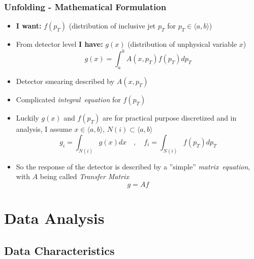 \documentclass[compress]{beamer}
\newcommand{\pt}{p_{T}}
\begin{document}
\begin{frame}
\frametitle{Unfolding - Mathematical Formulation}
\begin{itemize}
   \item \textbf{I want:} $f(\pt)$ (distribution of inclusive jet $\pt$ for $\pt \in
    \langle a, b \rangle$)
  \item From detector level \textbf{I have:} $g(x)$ (distribution of unphysical variable
    $x$)
  \begin{equation*}
    g(x) = \int_a^b A(x,\pt) f(\pt) d\pt
  \end{equation*}
  \item Detector smearing described by $A(x,\pt)$
  \item Complicated \textit{\color{red}integral~equation} for $f(\pt)$
   \item Luckily $g(x)$ and $f(\pt)$ are for practical purpose discretized and in
    analysis, I assume $x \in \langle a, b \rangle$, $N(i) \subset \langle
    a , b \rangle$ 
  \begin{equation*}
    g_i = \int_{N(i)}g(x)dx \quad , \quad f_i = \int_{N(i)}f(\pt)d\pt
  \end{equation*}
  \item So the response of the detector is described by a ''simple''
    \textit{\color{red}matrix~equation}, with $A$ being called
    \textit{\color{red}Transfer Matrix} 
  \begin{equation*}
    g = A f
  \end{equation*}
\end{itemize}
\end{frame}

\section{Data Analysis}
\subsection{Data Characteristics}
\end{document}

